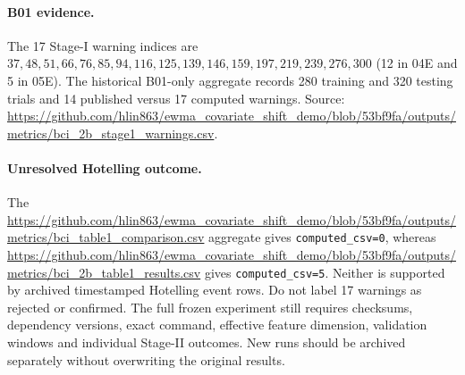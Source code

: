 \paragraph{B01 evidence.} The 17 Stage-I warning indices are $37,48,51,66,76,85,94,116,125,139,146,159,197,219,239,276,300$ (12 in 04E and 5 in 05E). The historical B01-only aggregate records 280 training and 320 testing trials and 14 published versus 17 computed warnings. Source: \url{https://github.com/hlin863/ewma_covariate_shift_demo/blob/53bf9fa/outputs/metrics/bci_2b_stage1_warnings.csv}.
\paragraph{Unresolved Hotelling outcome.} The \url{https://github.com/hlin863/ewma_covariate_shift_demo/blob/53bf9fa/outputs/metrics/bci_table1_comparison.csv} aggregate gives \texttt{computed\_csv=0}, whereas \url{https://github.com/hlin863/ewma_covariate_shift_demo/blob/53bf9fa/outputs/metrics/bci_2b_table1_results.csv} gives \texttt{computed\_csv=5}. Neither is supported by archived timestamped Hotelling event rows. Do not label 17 warnings as rejected or confirmed. The full frozen experiment still requires checksums, dependency versions, exact command, effective feature dimension, validation windows and individual Stage-II outcomes. New runs should be archived separately without overwriting the original results.
